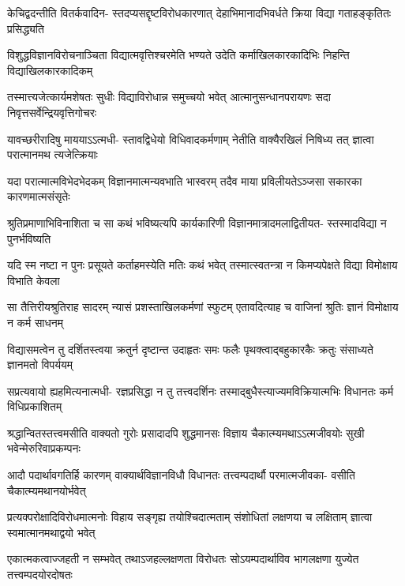 \fourlineindentedshloka
{केचिद्वदन्तीति वितर्कवादिन-}
{स्तदप्यसद्दृष्टविरोधकारणात्}
{देहाभिमानादभिवर्धते क्रिया}
{विद्या गताहङ्कृतितः प्रसिद्ध्यति} %

\fourlineindentedshloka
{विशुद्धविज्ञानविरोचनाञ्चिता}
{विद्यात्मवृत्तिश्चरमेति भण्यते}
{उदेति कर्माखिलकारकादिभिः}
{निहन्ति विद्याखिलकारकादिकम्} %

\fourlineindentedshloka
{तस्मात्त्यजेत्कार्यमशेषतः सुधीः}
{विद्याविरोधान्न समुच्चयो भवेत्}
{आत्मानुसन्धानपरायणः सदा}
{निवृत्तसर्वेन्द्रियवृत्तिगोचरः} %

\fourlineindentedshloka
{यावच्छरीरादिषु माययाऽऽत्मधी-}
{स्तावद्विधेयो विधिवादकर्मणाम्}
{नेतीति वाक्यैरखिलं निषिध्य तत्}
{ज्ञात्वा परात्मानमथ त्यजेत्क्रियाः} %

\fourlineindentedshloka
{यदा परात्मात्मविभेदभेदकम्}
{विज्ञानमात्मन्यवभाति भास्वरम्}
{तदैव माया प्रविलीयतेऽञ्जसा}
{सकारका कारणमात्मसंसृतेः} %

\fourlineindentedshloka
{श्रुतिप्रमाणाभिविनाशिता च सा}
{कथं भविष्यत्यपि कार्यकारिणी}
{विज्ञानमात्रादमलाद्वितीयत-}
{स्तस्मादविद्या न पुनर्भविष्यति} %

\fourlineindentedshloka
{यदि स्म नष्टा न पुनः प्रसूयते}
{कर्ताहमस्येति मतिः कथं भवेत्}
{तस्मात्स्वतन्त्रा न किमप्यपेक्षते}
{विद्या विमोक्षाय विभाति केवला} %

\fourlineindentedshloka
{सा तैत्तिरीयश्रुतिराह सादरम्}
{न्यासं प्रशस्ताखिलकर्मणां स्फुटम्}
{एतावदित्याह च वाजिनां श्रुतिः}
{ज्ञानं विमोक्षाय न कर्म साधनम्} %

\fourlineindentedshloka
{विद्यासमत्वेन तु दर्शितस्त्वया}
{क्रतुर्न दृष्टान्त उदाहृतः समः}
{फलैः पृथक्त्वाद्बहुकारकैः क्रतुः}
{संसाध्यते ज्ञानमतो विपर्ययम्} %

\fourlineindentedshloka
{सप्रत्यवायो ह्यहमित्यनात्मधी-}
{रज्ञप्रसिद्धा न तु तत्त्वदर्शिनः}
{तस्माद्बुधैस्त्याज्यमविक्रियात्मभिः}
{विधानतः कर्म विधिप्रकाशितम्} %

\fourlineindentedshloka
{श्रद्धान्वितस्तत्त्वमसीति वाक्यतो}
{गुरोः प्रसादादपि शुद्धमानसः}
{विज्ञाय चैकात्म्यमथाऽऽत्मजीवयोः}
{सुखी भवेन्मेरुरिवाप्रकम्पनः} %

\fourlineindentedshloka
{आदौ पदार्थावगतिर्हि कारणम्}
{वाक्यार्थविज्ञानविधौ विधानतः}
{तत्त्वम्पदार्थौ परमात्मजीवका-}
{वसीति चैकात्म्यमथानयोर्भवेत्} %

\fourlineindentedshloka
{प्रत्यक्परोक्षादिविरोधमात्मनोः}
{विहाय सङ्गृह्य तयोश्चिदात्मताम्}
{संशोधितां लक्षणया च लक्षिताम्}
{ज्ञात्वा स्वमात्मानमथाद्वयो भवेत्} %

\fourlineindentedshloka
{एकात्मकत्वाज्जहती न सम्भवेत्}
{तथाऽजहल्लक्षणता विरोधतः}
{सोऽयम्पदार्थाविव भागलक्षणा}
{युज्येत तत्त्वम्पदयोरदोषतः} %

